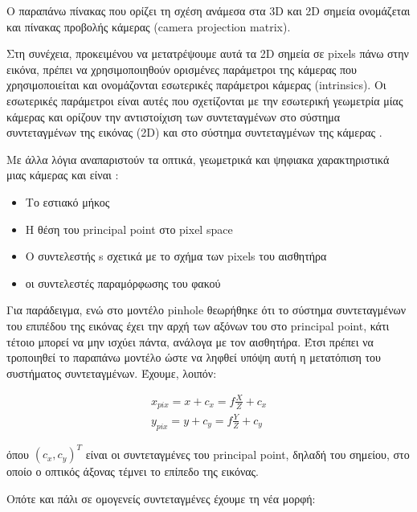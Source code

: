 Ο παραπάνω πίνακας που ορίζει τη σχέση ανάμεσα στα 3D και 2D σημεία ονομάζεται και πίνακας προβολής κάμερας (camera projection matrix).




Στη συνέχεια, προκειμένου να μετατρέψουμε αυτά τα 2D σημεία σε pixels πάνω στην εικόνα, πρέπει να χρησιμοποιηθούν ορισμένες παράμετροι της κάμερας που χρησιμοποιείται και ονομάζονται εσωτερικές παράμετροι κάμερας (intrinsics).
Οι εσωτερικές παράμετροι είναι αυτές που σχετίζονται με την εσωτερική γεωμετρία μίας κάμερας και ορίζουν την αντιστοίχιση των συντεταγμένων στο σύστημα συντεταγμένων της εικόνας (2D) και στο σύστημα συντεταγμένων της κάμερας \cite{Malik2002}. 


Με άλλα λόγια αναπαριστούν τα οπτικά, γεωμετρικά και ψηφιακα χαρακτηριστικά μιας κάμερας και είναι :

\begin{itemize}
\item Το εστιακό μήκος
\item Η θέση του principal point στο pixel space
\item Ο συντελεστής s σχετικά με το σχήμα των pixels του αισθητήρα
\item οι συντελεστές παραμόρφωσης του φακού
\end{itemize}



Για παράδειγμα, ενώ στο μοντέλο pinhole θεωρήθηκε ότι το σύστημα συντεταγμένων του επιπέδου της εικόνας έχει την αρχή των αξόνων του στο principal point, κάτι τέτοιο μπορεί να μην ισχύει πάντα, ανάλογα με τον αισθητήρα. Έτσι πρέπει να τροποιηθεί το παραπάνω μοντέλο ώστε να ληφθεί υπόψη αυτή η μετατόπιση του συστήματος συντεταγμένων. Έχουμε, λοιπόν:


\begin{equation}
\begin{aligned}
x_{pix}=x+c_{x}=f\frac{X}{Z}+c_{x}\\[0.3cm]
y_{pix}=y+c_{y}=f\frac{Y}{Z}+c_{y}
\end{aligned}
\end{equation}

όπου $(c_{x},c_{y})^{T}$ είναι οι συντεταγμένες του principal point, δηλαδή του σημείου, στο οποίο ο οπτικός άξονας τέμνει το επίπεδο της εικόνας. 

Οπότε και πάλι σε ομογενείς συντεταγμένες έχουμε τη νέα μορφή:

